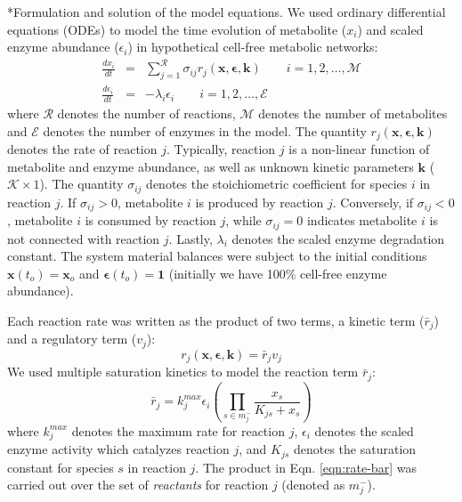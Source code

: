 \documentclass[12pt]{article}
\makeatletter
\renewcommand\subsection{\@startsection
	{subsection}{2}{0mm}
	{-0.05in}
	{-0.5\baselineskip}
	{\normalfont\normalsize\bfseries}}
\makeatother
\begin{document}
\subsection*{Formulation and solution of the model equations.}
We used ordinary differential equations (ODEs) to model the time evolution of metabolite ($x_{i}$) and scaled enzyme abundance ($\epsilon_{i}$) in hypothetical cell-free metabolic networks:
\begin{eqnarray}
	\frac{dx_{i}}{dt} & = & \sum_{j = 1}^{\mathcal{R}}\sigma_{ij}r_{j}\left(\mathbf{x},\mathbf{\epsilon},\mathbf{k}\right)\qquad{i=1,2,\hdots,\mathcal{M}}\\
	\frac{d\epsilon_{i}}{dt} & = & -\lambda_{i}\epsilon_{i}\qquad{i = 1,2,\hdots,\mathcal{E}}
\end{eqnarray}where $\mathcal{R}$ denotes the number of reactions, $\mathcal{M}$ denotes the number of metabolites and $\mathcal{E}$ denotes the number of enzymes in the model. 
The quantity $r_{j}\left(\mathbf{x},\mathbf{\epsilon},\mathbf{k}\right)$ denotes the rate of reaction $j$. 
Typically, reaction $j$ is a non-linear function of metabolite and enzyme abundance, as well as unknown kinetic parameters $\mathbf{k}$ ($\mathcal{K}\times{1}$). 
The quantity $\sigma_{ij}$ denotes the stoichiometric coefficient for species $i$ in reaction $j$. 
If $\sigma_{ij}>0$, metabolite $i$ is produced by reaction $j$. 
Conversely, if $\sigma_{ij}<0$, metabolite $i$ is consumed by reaction $j$, while $\sigma_{ij} = 0$ indicates metabolite $i$ is not connected with reaction $j$. 
Lastly, $\lambda_{i}$ denotes the scaled enzyme degradation constant. 
The system material balances were subject to the initial conditions $\mathbf{x}\left(t_{o}\right) = \mathbf{x}_{o}$ and $\mathbf{\epsilon}\left(t_{o}\right) = \mathbf{1}$ (initially we have 100\% cell-free enzyme abundance). 

Each reaction rate was written as the product of two terms, a kinetic term ($\bar{r}_{j}$) and a regulatory term ($v_{j}$):
\begin{equation}\label{eqn:rate-factor}
	r_{j}\left(\mathbf{x},\mathbf{\epsilon},\mathbf{k}\right) = \bar{r}_{j}v_{j}
\end{equation}
We used multiple saturation kinetics to model the reaction term $\bar{r}_{j}$:
\begin{equation}\label{eqn:rate-bar}
	\bar{r}_{j} = k_{j}^{max}\epsilon_{i}\left(\prod_{s\in{m_{j}^{-}}}\frac{x_{s}}{K_{js} + x_{s}}\right)
\end{equation}
where $k_{j}^{max}$ denotes the maximum rate for reaction $j$, $\epsilon_{i}$ denotes the scaled enzyme activity which catalyzes reaction $j$, and
$K_{js}$ denotes the saturation constant for species $s$ in reaction $j$. 
The product in Eqn. \eqref{eqn:rate-bar} was carried out over the set of \textit{reactants} for reaction $j$ (denoted as $m_{j}^{-}$). 
\end{document}

